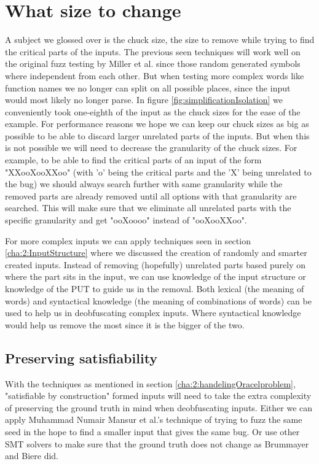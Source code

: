 \section{What size to change}
\label{cha:3:Chucksize}
A subject we glossed over is the chuck size, the size to remove while trying to find the critical parts of the inputs. 
The previous seen techniques will work well on the original fuzz testing by Miller et al.\cite{4originalFuzzingUnixUtils} since those random generated symbols where independent from each other. But when testing more complex words like function names we no longer can split on all possible places, since the input would most likely no longer parse. 
In figure \ref{fig:simplificationIsolation} we conveniently took one-eighth of the input as the chuck sizes for the ease of the example. For performance reasons we hope we can keep our chuck sizes as big as possible to be able to discard larger unrelated parts of the inputs. But when this is not possible we will need to decrease the granularity of the chuck sizes.
For example, to be able to find the critical parts of an input of the form "XXooXooXXoo" (with 'o' being the critical parts and the 'X' being unrelated to the bug) we should always search further with same granularity while the removed parts are already removed until all options with that granularity are searched\cite{bookZellerwhyProgramsFail}. This will make sure that we eliminate all unrelated parts with the specific granularity and get "ooXoooo" instead of "ooXooXXoo". 

For more complex inputs we can apply techniques seen in section \ref{cha:2:InputStructure} where we discussed the creation of randomly and smarter created inputs. Instead of removing (hopefully) unrelated parts based purely on where the part sits in the input, we can use knowledge of the input structure or knowledge of the PUT to guide us in the removal\cite{bookZellerwhyProgramsFail}. Both lexical (the meaning of words) and syntactical knowledge (the meaning of combinations of words) can be used to help us in deobfuscating complex inputs. Where syntactical knowledge would help us remove the most since it is the bigger of the two.

\subsection{Preserving satisfiability}
With the techniques as mentioned in section \ref{cha:2:handelingOracelproblem}, "satisfiable by construction" formed inputs  will need to take the extra complexity of preserving the ground truth in mind when deobfuscating inputs. Either we can apply Muhammad Numair Mansur et al.'s\cite{1mansur2020detecting} technique of trying to fuzz the same seed in the hope to find a smaller input that gives the same bug. Or use other SMT solvers to make sure that the ground truth does not change as Brummayer and Biere\cite{2FuzzingAndDeltaDebuggingSMTSolvers} did.

